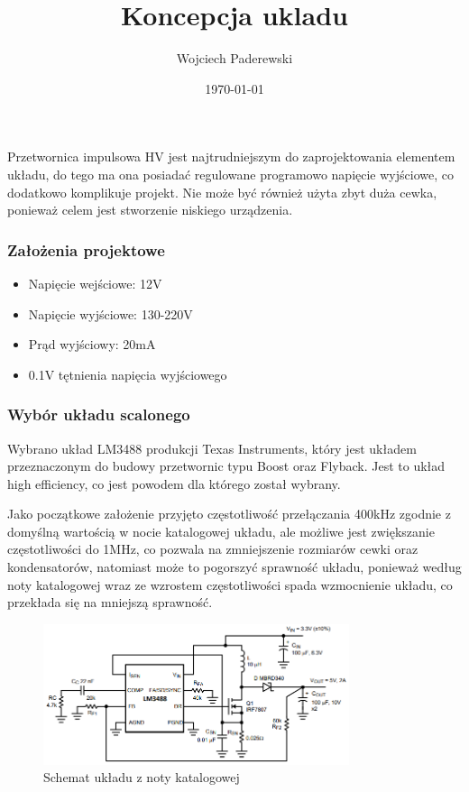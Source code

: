 \documentclass[../../main.tex]{subfiles}
\author{Wojciech Paderewski}
\date{\today}
\title{Koncepcja ukladu}
\begin{document}
Przetwornica impulsowa HV jest najtrudniejszym do zaprojektowania elementem układu, 
do tego ma ona posiadać regulowane programowo napięcie wyjściowe, co dodatkowo komplikuje projekt.
Nie może być również użyta zbyt duża cewka, ponieważ celem jest stworzenie niskiego urządzenia.

\subsubsection{Założenia projektowe}
\begin{itemize}
    \item Napięcie wejściowe: 12\si{\volt}
    \item Napięcie wyjściowe: 130-220\si{\volt}
    \item Prąd wyjściowy: 20\si{\milli\ampere}
    \item 0.1\si{\volt} tętnienia napięcia wyjściowego
\end{itemize}

\subsubsection{Wybór układu scalonego}
Wybrano układ LM3488 produkcji Texas Instruments, który jest układem przeznaczonym do budowy przetwornic typu Boost oraz Flyback. 
Jest to układ high efficiency, co jest powodem dla którego został wybrany\cite{st:lm3488}.

Jako początkowe założenie przyjęto częstotliwość przełączania 400kHz zgodnie z domyślną wartością w nocie katalogowej układu, 
ale możliwe jest zwiększanie częstotliwości do 1MHz, co pozwala na zmniejszenie rozmiarów cewki oraz kondensatorów, natomiast może to
pogorszyć sprawność układu, ponieważ według noty katalogowej wraz ze wzrostem częstotliwości spada wzmocnienie układu, co przekłada się na mniejszą sprawność.

\begin{figure}[H]
    \centering
    \includegraphics[width=0.8\textwidth]{boost.png}
    \caption{Schemat układu z noty katalogowej\cite{st:lm3488}}
\end{figure}
\end{document}

